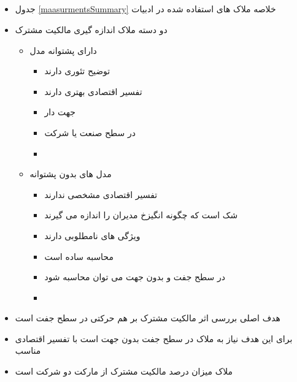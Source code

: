   
\subsection{}

\begin{itemize}
	\item 
	جدول 
	\ref{maasurmentsSummary}
	خلاصه ملاک های استفاده شده در ادبیات
	\item 
	دو دسته ملاک اندازه گیری مالکیت مشترک
	\begin{itemize}
		\item 
		دارای پشتوانه مدل
		\begin{itemize}
			\item 
			توضیح تئوری دارند
			\item 
			تفسیر اقتصادی بهتری دارند
			\item 
			جهت دار
			\item
			در سطح صنعت یا شرکت
			\item
		\end{itemize}
		\item 
	مدل های بدون پشتوانه
	\begin{itemize}
		\item 
		تفسیر اقتصادی مشخصی ندارند
		\item 
		شک است که چگونه انگیزخ مدیران را اندازه می گیرند
		\item 
		ویژگی های نامطلوبی دارند 
		\item
		محاسبه ساده است
		\item
		در سطح جفت و بدون جهت می توان محاسبه شود
		
		\item
	\end{itemize}
	
		
	\end{itemize}
	
	\item 
	هدف اصلی بررسی اثر مالکیت مشترک بر هم حرکتی در سطح جفت است
	
	\item 
	برای این هدف نیاز به ملاک در سطح جفت بدون جهت است با تفسیر اقتصادی مناسب
	
	\item 
	ملاک
	\cite{AntonPolk}
	میزان درصد مالکیت مشترک از مارکت دو شرکت است
	

\end{itemize}

